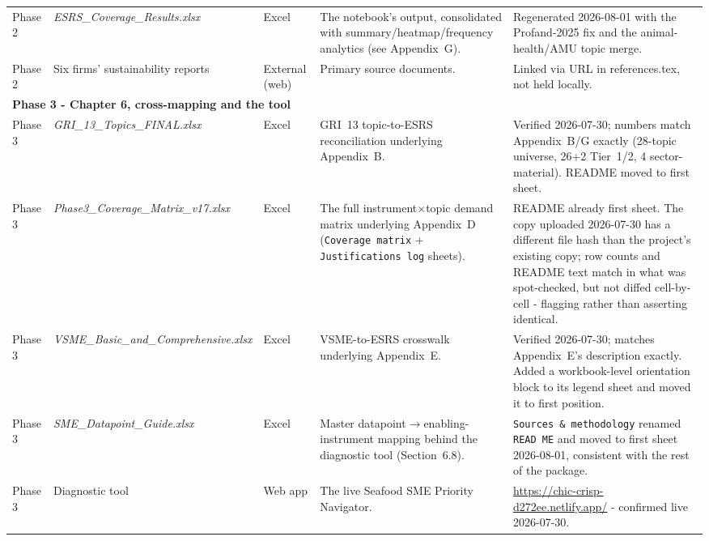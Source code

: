 \documentclass[
]{article}
\newcommand{\fb}{\discretionary{}{}{}} %
\begin{document}
\begin{landscape}
\begin{longtable}{p{2.5cm}p{3.8cm}p{1.0cm}p{5.2cm}p{3.7cm}}
Phase 2 & \emph{ESRS\_\fb Coverage\_\fb Results.xlsx} & Excel & The notebook's output, consolidated with summary/heatmap/frequency analytics (see Appendix~G). & Regenerated 2026-08-01 with the Profand-2025 fix and the animal-health/AMU topic merge. \\
Phase 2 & Six firms' sustainability reports & External (web) & Primary source documents. & Linked via URL in references.tex, not held locally. \\
\multicolumn{5}{l}{\rule{0pt}{1.1em}\textbf{Phase 3 - Chapter 6, cross-mapping and the tool}}\\[1pt]
Phase 3 & \emph{GRI\_\fb 13\_\fb Topics\_\fb FINAL.xlsx} & Excel & GRI~13 topic-to-ESRS reconciliation underlying Appendix~B. & Verified 2026-07-30; numbers match Appendix~B/G exactly (28-topic universe, 26+2 Tier~1/2, 4 sector-material). README moved to first sheet. \\
Phase 3 & \emph{Phase3\_\fb Coverage\_\fb Matrix\_\fb v17.xlsx} & Excel & The full instrument$\times$topic demand matrix underlying Appendix~D (\texttt{Coverage matrix} + \texttt{Justifications log} sheets). & README already first sheet. The copy uploaded 2026-07-30 has a different file hash than the project's existing copy; row counts and README text match in what was spot-checked, but not diffed cell-by-cell - flagging rather than asserting identical. \\
Phase 3 & \emph{VSME\_\fb Basic\_\fb and\_\fb Comprehensive.xlsx} & Excel & VSME-to-ESRS crosswalk underlying Appendix~E. & Verified 2026-07-30; matches Appendix~E's description exactly. Added a workbook-level orientation block to its legend sheet and moved it to first position. \\
Phase 3 & \emph{SME\_\fb Datapoint\_\fb Guide.xlsx} & Excel & Master datapoint$\to$enabling-instrument mapping behind the diagnostic tool (Section~6.8). & \texttt{Sources \& methodology} renamed \texttt{READ ME} and moved to first sheet 2026-08-01, consistent with the rest of the package. \\
Phase 3 & Diagnostic tool & Web app & The live Seafood SME Priority Navigator. & \url{https://chic-crisp-d272ee.netlify.app/} - confirmed live 2026-07-30. \\
\bottomrule\end{longtable}\end{landscape}
\end{document}
